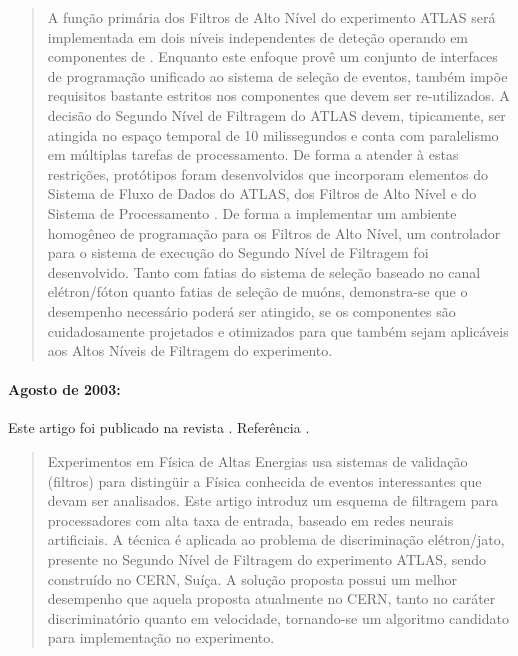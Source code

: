 \begin{quotation}
A função primária dos Filtros de Alto Nível do experimento ATLAS será
implementada em dois níveis independentes de deteção operando em componentes
de .  Enquanto este enfoque provê um conjunto de interfaces de
programação unificado ao sistema de seleção de eventos, também impõe
requisitos bastante estritos nos componentes  que devem ser
re-utilizados. A decisão do Segundo Nível de Filtragem do ATLAS devem,
tipicamente, ser atingida no espaço temporal de 10 milissegundos e conta com
paralelismo em múltiplas tarefas de processamento. De forma a atender à estas
restrições, protótipos foram desenvolvidos que incorporam elementos do Sistema
de Fluxo de Dados do ATLAS, dos Filtros de Alto Nível e do Sistema de Processamento
. De forma a implementar um ambiente homogêneo de programação
para os Filtros de Alto Nível, um controlador para o sistema de execução do
Segundo Nível de Filtragem foi desenvolvido. Tanto com fatias do sistema de
seleção baseado no canal elétron/fóton quanto fatias de seleção de muóns,
demonstra-se que o desempenho necessário poderá ser atingido, se os
componentes  são cuidadosamente projetados e otimizados para que
também sejam aplicáveis aos Altos Níveis de Filtragem do experimento.
\end{quotation}

\paragraph{Agosto de 2003: } Este artigo foi publicado
na revista . Referência
\cite{aa:nima-2003}. 

\begin{quotation}
Experimentos em Física de Altas Energias usa sistemas de validação
 (filtros) para distingüir a Física conhecida de eventos
interessantes que devam ser analisados. Este artigo introduz um esquema de
filtragem para processadores com alta taxa de entrada, baseado em redes
neurais artificiais. A técnica é aplicada ao problema de discriminação
elétron/jato, presente no Segundo Nível de Filtragem do experimento ATLAS,
sendo construído no CERN, Suíça. A solução proposta possui um melhor
desempenho que aquela proposta atualmente no CERN, tanto no caráter
discriminatório quanto em velocidade, tornando-se um algoritmo candidato para
implementação no experimento.
\end{quotation}

